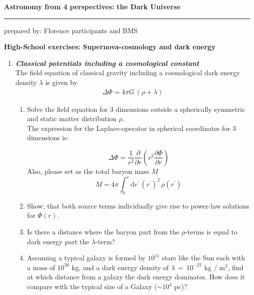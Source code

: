 \documentclass[a4paper,12pt]{article}
\newcommand{\question}[1]{\textbf{\textit{#1}}}
\newcommand{\HRule}{\rule{\linewidth}{0.3mm}}
\newcommand{\dd}{\mathrm{d}}
\begin{document}
\pagestyle{empty}

\begin{center}
\LARGE \textbf{Astronomy from 4 perspectives: the Dark Universe}
\HRule
\end{center}
\begin{flushright}
prepared by: Florence participants and BMS
\end{flushright}
\begin{center}
{\Large \textbf{High-School exercises: Supernova-cosmology and dark energy}}
\end{center}
\vspace{5mm}

\begin{enumerate}

\item \question{Classical potentials including a cosmological constant}\\
The field equation of classical gravity including a cosmological dark
energy density $\lambda$ is given by
\begin{align}
\Delta\Phi = 4\pi G\,(\rho + \lambda)
\end{align}
\begin{enumerate}
\item{Solve the field equation for $3$ dimensions outside a
    spherically symmetric and static matter distribution $\rho$. \\
    The expression for the Laplace-operator in spherical coordinates for $3$ dimensions is: 

\begin{equation}
\Delta\Phi = \frac{1}{r^{2}}\frac{\partial}{\partial r}\left(r^{2}\frac{\partial\Phi}{\partial r}\right)
\end{equation}    
    Also, please set as the total baryon mass $M$
\begin{equation}
M = 4\pi\int_0^r\dd r^\prime\, (r^\prime)^2\,\rho(r^\prime)
\end{equation}
}
\item{Show, that both source terms individually give rise to power-law solutions for $\Phi(r)$.}
\item{Is there a distance where the baryon part from the $\rho$-terms
    is equal to dark energy part the $\lambda$-term?}
\item{Assuming a typical galaxy is formed by $10^{11}$ stars like
    the Sun each with a mass of $10^{30}$ kg, and a dark energy density
    of $\lambda\,=\,10^{-27}$ kg / m$^3$, find at which distance from a galaxy the
    dark energy dominates. How does it compare with the typical size
    of a Galaxy ($\sim 10^4$ pc)?}
\end{enumerate}


\end{enumerate}
\end{document}
